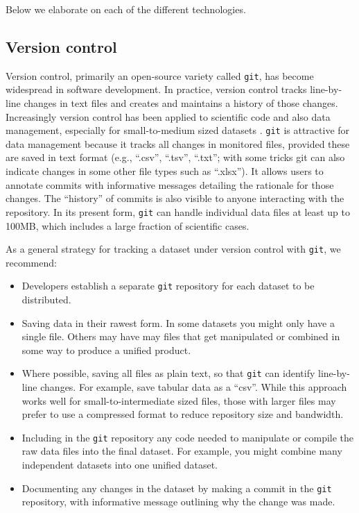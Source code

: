 \documentclass[a4paper,num-refs]{assets/oup-contemporary}
\begin{document}
Below we elaborate on each of the different technologies.

\subsection{Version control}

Version control, primarily an open-source variety called \texttt{git}, has become widespread in software development. In practice, version control tracks line-by-line changes in text files and creates and maintains a history of those changes. Increasingly version control has been applied to scientific code and also data management, especially for small-to-medium sized datasets \cite{Ram-2013, Perkel-2016, Lowndes-2017}. \texttt{git} is attractive for data management because it tracks all changes in monitored files, provided these are saved in text format (e.g., ``.csv'', ``.tsv'', ``.txt''; with some tricks git can also indicate changes in some other file types such as ``.xlsx''). It  allows users to annotate commits with informative messages detailing the rationale for those changes.  The ``history'' of commits is also visible to anyone interacting with the repository. In its present form, \texttt{git} can handle individual data files at least up to 100MB, which includes a large fraction of scientific cases.

As a general strategy for tracking a dataset under version control with \texttt{git}, we recommend:
\begin{itemize}
  \item Developers establish a separate \texttt{git} repository for each dataset to be distributed.
  \item Saving data in their rawest form. In some datasets you might only have a single file. Others may have may files that get manipulated or combined in some way to produce a unified product.
  \item Where possible, saving all files as plain text, so that \texttt{git} can identify line-by-line changes. For example, save tabular data as a ``csv''. While this approach works well for small-to-intermediate sized files, those with larger files may prefer to use a compressed format to reduce repository size and bandwidth. 
  \item Including in the \texttt{git} repository any code needed to manipulate or compile the raw data files into the final dataset. For example, you might combine many independent datasets into one unified dataset.
  \item Documenting any changes in the dataset by making a commit in the \texttt{git} repository, with informative message outlining why the change was made.
\end{itemize}
\end{document}
